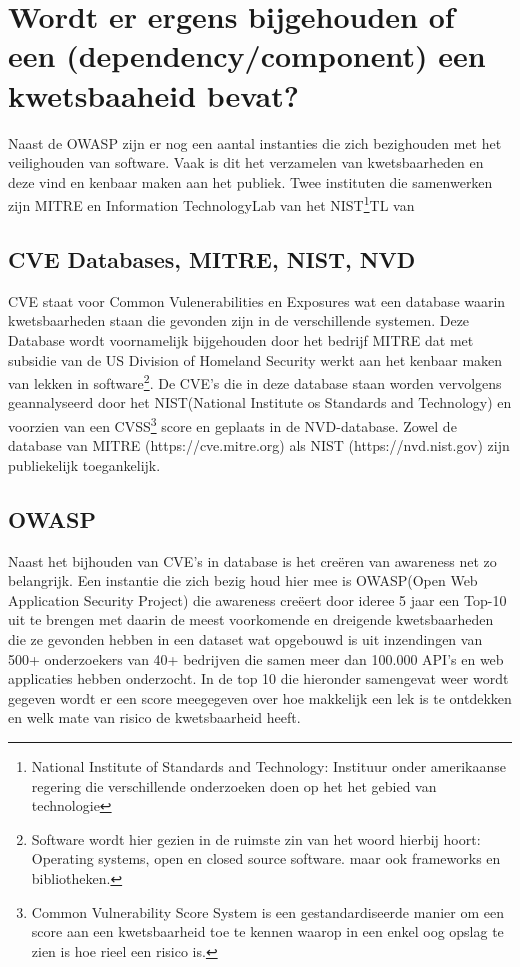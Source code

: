 \section{Wordt er ergens bijgehouden of een (dependency/component) een kwetsbaaheid bevat?}\label{sec:item-wordt-er-ergens-bijgehouden-of-een-dependency/component)-een-kwetsbaaheid-bevat?}
Naast de OWASP zijn er nog een aantal instanties die zich bezighouden met het veilighouden van software. Vaak is dit het verzamelen van kwetsbaarheden en deze vind en kenbaar maken aan het publiek. Twee instituten die samenwerken zijn MITRE en Information TechnologyLab van het NIST\footnote{National Institute of Standards and Technology: Instituur onder amerikaanse regering die verschillende onderzoeken doen op het het gebied van technologie}TL van

\subsection{CVE Databases, MITRE, NIST, NVD}\label{subsec:mitre-nist-nvd}
CVE staat voor Common Vulenerabilities en Exposures wat een database waarin kwetsbaarheden staan die gevonden zijn in de verschillende systemen.
Deze Database wordt voornamelijk bijgehouden door het bedrijf MITRE dat met subsidie van de US Division of Homeland Security werkt aan het kenbaar maken van lekken in software\footnote{Software wordt hier gezien in de ruimste zin van het woord hierbij hoort: Operating systems, open en closed source software. maar ook frameworks en bibliotheken.}.
De CVE's die in deze database staan worden vervolgens geannalyseerd door het NIST(National Institute os Standards and Technology) en voorzien van een CVSS\footnote{Common Vulnerability Score System is een gestandardiseerde manier om een score aan een kwetsbaarheid toe te kennen waarop in een enkel oog opslag te zien is hoe rieel een risico is.} score en geplaats in de NVD-database.
Zowel de database van MITRE (https://cve.mitre.org) als NIST (https://nvd.nist.gov) zijn publiekelijk toegankelijk.

\subsection{OWASP}\label{subsec:owasp}
Naast het bijhouden van CVE's in database is het creëren van awareness net zo belangrijk.
Een instantie die zich bezig houd hier mee is OWASP(Open Web Application Security Project) die awareness creëert door ideree 5 jaar een Top-10 uit te brengen met daarin de meest voorkomende en dreigende kwetsbaarheden die ze gevonden hebben in een dataset wat opgebouwd is uit inzendingen van 500+ onderzoekers van 40+ bedrijven die samen meer dan 100.000 API's en web applicaties hebben onderzocht.
In de top 10 die hieronder samengevat weer wordt gegeven wordt er een score meegegeven over hoe makkelijk een lek is te ontdekken en welk mate van risico de kwetsbaarheid heeft.


